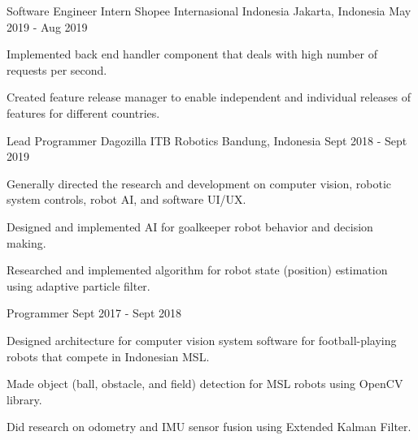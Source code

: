 

\begin{cventries}

  \cventry
    {Software Engineer Intern} %
    {Shopee Internasional Indonesia} %
    {Jakarta, Indonesia} %
    {May 2019 - Aug 2019} %
    {
      \begin{cvitems} %
        \item {Implemented back end handler component that deals with high number of requests per second.}
        \item {Created feature release manager to enable independent and individual releases of features for different countries.}
      \end{cvitems}
    }


  \cventry
	{Lead Programmer} %
	{Dagozilla ITB Robotics} %
	{Bandung, Indonesia} %
	{Sept 2018 - Sept 2019} %
	{
	  \begin{cvitems} %
		\item {Generally directed the research and development on computer vision, robotic system controls, robot AI, and software UI/UX.}
		\item {Designed and implemented AI for goalkeeper robot behavior and decision making.}
		\item {Researched and implemented algorithm for robot state (position) estimation using adaptive particle filter.}
	  \end{cvitems}
	}


  \cventry
	{Programmer} %
	{} %
	{} %
	{Sept 2017 - Sept 2018} %
	{
	  \begin{cvitems} %
		\item {Designed architecture for computer vision system software for football-playing robots that compete in Indonesian MSL.}
		\item {Made object (ball, obstacle, and field) detection for MSL robots using OpenCV library.}
        \item {Did research on odometry and IMU sensor fusion using Extended Kalman Filter.}
	  \end{cvitems}
	}
\end{cventries}
